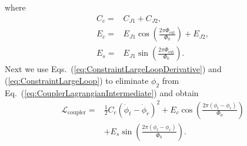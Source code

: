 where
\begin{align}
    C_c = & C_{J1} + C_{J2}, \nonumber \\
    E_c = & E_{J1}\cos(\frac{2\pi\Phi_{\text{ext}}}{\Phi_0}) + E_{J2}, \nonumber \\
    E_s = &  E_{J1}\sin(\frac{2\pi\Phi_{\text{ext}}}{\Phi_0}).
\end{align}
Next we use Eqs.~(\ref{eq:ConstraintLargeLoopDerivative}) and (\ref{eq:ConstraintLargeLoop}) to eliminate $\phi_2$ from Eq.~(\ref{eq:CouplerLagrangianIntermediate}) and obtain
\begin{align}
    \mathcal{L}_{\text{coupler}}=&\frac{1}{2}C_c(\dot{\phi}_t-\dot{\phi}_r)^2 + E_c\cos(\frac{2\pi (\phi_t-\phi_r)}{\Phi_0}) \nonumber \\ & + E_s\sin(\frac{2\pi (\phi_t-\phi_r)}{\Phi_0}).
\end{align}

